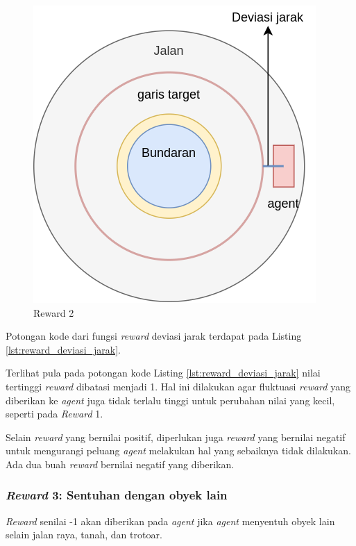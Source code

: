 \begin{figure}[H] 
	\centering
	\includegraphics[width=.85\linewidth]{images/reward_deviasi_jarak}
	\caption{Reward 2}
	\label{fig:reward_deviasi_jarak}
\end{figure}

Potongan kode dari fungsi \textit{reward} deviasi jarak terdapat pada Listing \ref{lst:reward_deviasi_jarak}.



Terlihat pula pada potongan kode Listing \ref{lst:reward_deviasi_jarak} nilai tertinggi \textit{reward} dibatasi menjadi 1. Hal ini dilakukan agar fluktuasi \textit{reward} yang diberikan ke \textit{agent} juga tidak terlalu tinggi untuk perubahan nilai yang kecil, seperti pada \textit{Reward} 1.


Selain \textit{reward} yang bernilai positif, diperlukan juga \textit{reward} yang bernilai negatif untuk mengurangi peluang \textit{agent} melakukan hal yang sebaiknya tidak dilakukan. Ada dua buah \textit{reward} bernilai negatif yang diberikan.

\subsubsection{\textit{Reward} 3: Sentuhan dengan obyek lain}
\textit{Reward} senilai -1 akan diberikan pada \textit{agent} jika \textit{agent} menyentuh obyek lain selain jalan raya, tanah, dan trotoar.


